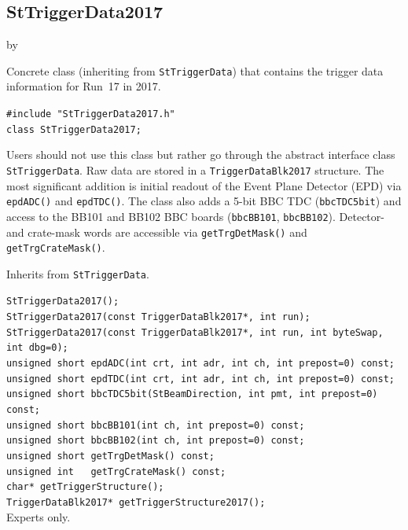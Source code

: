 \documentclass[twoside]{article}
\newcommand{\entrylabel}[1]{\mbox{\textbf{{#1}}}\hfil}%
\newenvironment{entry}
{\begin{list}{}%
    {\renewcommand{\makelabel}{\entrylabel}%
     \setlength{\labelwidth}{90pt}%
     \setlength{\leftmargin}{\labelwidth}
     \advance\leftmargin by \labelsep%
      }%
    }%
  {\end{list}}
\newcommand{\Entrylabel}[1]%
{\raisebox{0pt}[1ex][0pt]{\makebox[\labelwidth][l]%
    {\parbox[t]{\labelwidth}{\hspace{0pt}\textbf{{#1}}}}}}
\newenvironment{Entry}%
{\renewcommand{\entrylabel}{\Entrylabel}\begin{entry}}%
  {\end{entry}}
\begin{document}
\subsection{StTriggerData2017}
\label{sec:StTriggerData2017}
\begin{Entry}
\item[Summary] Concrete class (inheriting from \texttt{StTriggerData}) that
    contains the trigger data information for Run~17 in 2017.
\item[Synopsis]
    \verb+#include "StTriggerData2017.h"+\\
    \verb+class StTriggerData2017;+\\
\item[Description] Users should not use this class but rather go through the
    abstract interface class \texttt{StTriggerData}.  Raw data are stored in a
    \verb+TriggerDataBlk2017+ structure.  The most significant addition is
    initial readout of the Event Plane Detector (EPD) via \verb+epdADC()+ and
    \verb+epdTDC()+.  The class also adds a 5-bit BBC TDC (\verb+bbcTDC5bit+)
    and access to the BB101 and BB102 BBC boards (\verb+bbcBB101+,
    \verb+bbcBB102+).  Detector- and crate-mask words are accessible via
    \verb+getTrgDetMask()+ and \verb+getTrgCrateMask()+.
\item[Related Classes] Inherits from \texttt{StTriggerData}.
\item[Public\\ Constructors]
    \verb+StTriggerData2017();+\\
    \verb+StTriggerData2017(const TriggerDataBlk2017*, int run);+\\
    \verb+StTriggerData2017(const TriggerDataBlk2017*, int run, int byteSwap, int dbg=0);+\\
    \verb+unsigned short epdADC(int crt, int adr, int ch, int prepost=0) const;+\\
    \verb+unsigned short epdTDC(int crt, int adr, int ch, int prepost=0) const;+\\
    \verb+unsigned short bbcTDC5bit(StBeamDirection, int pmt, int prepost=0) const;+\\
    \verb+unsigned short bbcBB101(int ch, int prepost=0) const;+\\
    \verb+unsigned short bbcBB102(int ch, int prepost=0) const;+\\
    \verb+unsigned short getTrgDetMask() const;+\\
    \verb+unsigned int   getTrgCrateMask() const;+\\
    \verb+char* getTriggerStructure();+\\
    \verb+TriggerDataBlk2017* getTriggerStructure2017();+\\
    Experts only.
\end{Entry}
\clearpage
\end{document}
